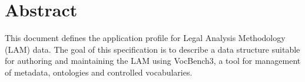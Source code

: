 \section*{Abstract}
This document defines the application profile for Legal Analysis Methodology (LAM) data. The goal of this specification is to describe a data structure suitable for authoring and maintaining the LAM using VocBench3, a tool for management of metadata, ontologies and controlled vocabularies.  